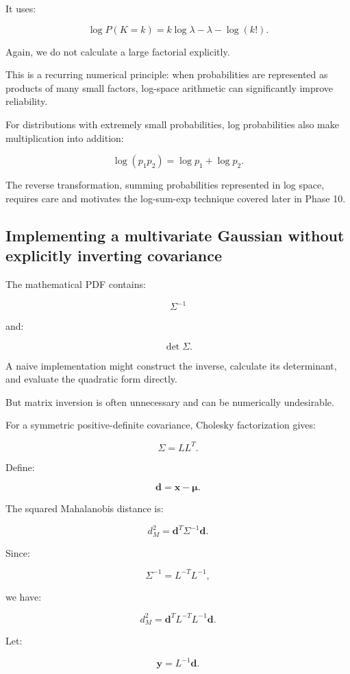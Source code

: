 It uses:

\[
 \log P(K=k) = k\log\lambda-\lambda-\log(k!).
\]

Again, we do not calculate a large factorial explicitly.

This is a recurring numerical principle: when probabilities are represented as products of many small factors, log-space arithmetic can significantly improve reliability.

For distributions with extremely small probabilities, log probabilities also make multiplication into addition:

\[
 \log(p_1p_2)=\log p_1+\log p_2.
\]

The reverse transformation, summing probabilities represented in log space, requires care and motivates the log-sum-exp technique covered later in Phase 10.

\subsection{Implementing a multivariate Gaussian without explicitly inverting covariance}\label{02-foundations-ii-ch031-implementing-a-multivariate-gaussian-without-explicitly-inverting-covariance}

The mathematical PDF contains:

\[
 \Sigma^{-1}
\]

and:

\[
 \det\Sigma.
\]

A naive implementation might construct the inverse, calculate its determinant, and evaluate the quadratic form directly.

But matrix inversion is often unnecessary and can be numerically undesirable.

For a symmetric positive-definite covariance, Cholesky factorization gives:

\[
 \boxed{\Sigma=LL^T}.
\]

Define:

\[
 \mathbf d=\mathbf x-\boldsymbol\mu.
\]

The squared Mahalanobis distance is:

\[
 d_M^2=\mathbf d^T\Sigma^{-1}\mathbf d.
\]

Since:

\[
 \Sigma^{-1}=L^{-T}L^{-1},
\]

we have:

\[
 d_M^2= \mathbf d^TL^{-T}L^{-1}\mathbf d.
\]

Let:

\[
 \mathbf y=L^{-1}\mathbf d.
\]

